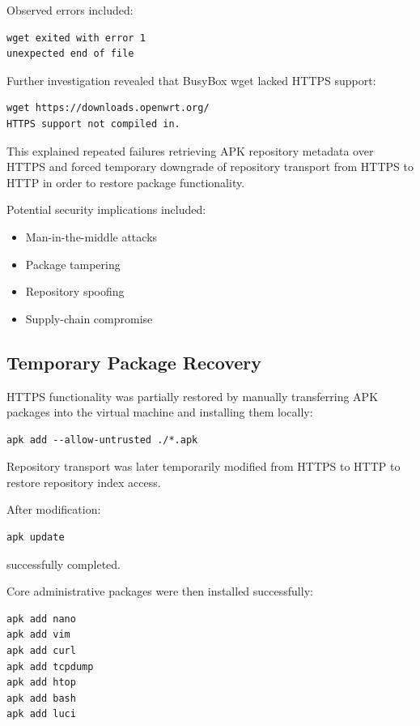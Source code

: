 \documentclass[conference]{IEEEtran}
\begin{document}
Observed errors included:

\begin{lstlisting}
wget exited with error 1
unexpected end of file
\end{lstlisting}

Further investigation revealed that BusyBox wget lacked HTTPS support:

\begin{lstlisting}
wget https://downloads.openwrt.org/
HTTPS support not compiled in.
\end{lstlisting}

This explained repeated failures retrieving APK repository metadata over HTTPS and forced temporary downgrade of repository transport from HTTPS to HTTP in order to restore package functionality.

Potential security implications included:

\begin{itemize}
    \item Man-in-the-middle attacks
    \item Package tampering
    \item Repository spoofing
    \item Supply-chain compromise
\end{itemize}

\subsection{Temporary Package Recovery}

HTTPS functionality was partially restored by manually transferring APK packages into the virtual machine and installing them locally:

\begin{lstlisting}
apk add --allow-untrusted ./*.apk
\end{lstlisting}

Repository transport was later temporarily modified from HTTPS to HTTP to restore repository index access.

After modification:

\begin{lstlisting}
apk update
\end{lstlisting}

successfully completed.

Core administrative packages were then installed successfully:

\begin{lstlisting}
apk add nano
apk add vim
apk add curl
apk add tcpdump
apk add htop
apk add bash
apk add luci
\end{lstlisting}
\end{document}
